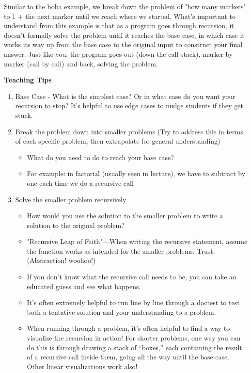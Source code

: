 \begin{blocksection}
Similar to the boba example, we break down the problem of "how many markers" to 1 + the next marker until we reach where we started. What's important to understand from this example is that as a program goes through recursion, it doesn't formally solve the problem until it reaches the base case, in which case it works its way up from the base case to the original input to construct your final answer. Just like you, the program goes out (down the call stack), marker by marker (call by call) and back, solving the problem.
\end{blocksection}

\begin{meta}
\textbf{Teaching Tips}
\begin{enumerate}
	    \item Base Case - What is the simplest case? Or in what case do you want your recursion to stop? It's helpful to use edge cases to nudge students if they get stuck.
	    \item Break the problem down into smaller problems (Try to address this in terms of each specific problem, then extrapolate for general understanding)
	    \begin{itemize}
			\item What do you need to do to reach your base case?
			\item For example: in factorial (usually seen in lecture), we have to subtract by one each time we do a recursive call
		\end{itemize}
		\item Solve the smaller problem recursively
		\begin{itemize}
			\item How would you use the solution to the smaller problem to write a solution to the original problem?
			\item "Recursive Leap of Faith"---When writing the recursive statement, assume the function works as intended for the smaller problems. Trust. (Abstraction! woohoo!)
			\item If you don't know what the recursive call needs to be, you can take an educated guess and see what happens. 
			\item It's often extremely helpful to run line by line through a doctest to test both a tentative solution and your understanding to a problem.
			\item When running through a problem, it's often helpful to find a way to visualize the recursion in action! For shorter problems, one way you can do this is through drawing a stack of ``boxes,'' each containing the result of a recursive call inside them, going all the way until the base case. Other linear visualizations work also!

\end{itemize}
\end{enumerate}
\end{meta}
